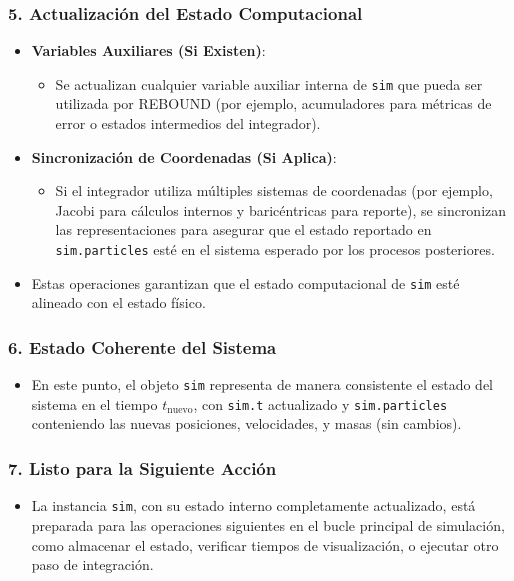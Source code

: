 \subsubsection*{5. Actualización del Estado Computacional}
\begin{itemize}
    \item \textbf{Variables Auxiliares (Si Existen)}:
    \begin{itemize}
        \item Se actualizan cualquier variable auxiliar interna de \texttt{sim} que pueda ser utilizada por REBOUND (por ejemplo, acumuladores para métricas de error o estados intermedios del integrador).
    \end{itemize}
    \item \textbf{Sincronización de Coordenadas (Si Aplica)}:
    \begin{itemize}
        \item Si el integrador utiliza múltiples sistemas de coordenadas (por ejemplo, Jacobi para cálculos internos y baricéntricas para reporte), se sincronizan las representaciones para asegurar que el estado reportado en \texttt{sim.particles} esté en el sistema esperado por los procesos posteriores.
    \end{itemize}
    \item Estas operaciones garantizan que el estado computacional de \texttt{sim} esté alineado con el estado físico.
\end{itemize}

\subsubsection*{6. Estado Coherente del Sistema}
\begin{itemize}
    \item En este punto, el objeto \texttt{sim} representa de manera consistente el estado del sistema en el tiempo $t_{\text{nuevo}}$, con \texttt{sim.t} actualizado y \texttt{sim.particles} conteniendo las nuevas posiciones, velocidades, y masas (sin cambios).
\end{itemize}

\subsubsection*{7. Listo para la Siguiente Acción}
\begin{itemize}
    \item La instancia \texttt{sim}, con su estado interno completamente actualizado, está preparada para las operaciones siguientes en el bucle principal de simulación, como almacenar el estado, verificar tiempos de visualización, o ejecutar otro paso de integración.
\end{itemize}

